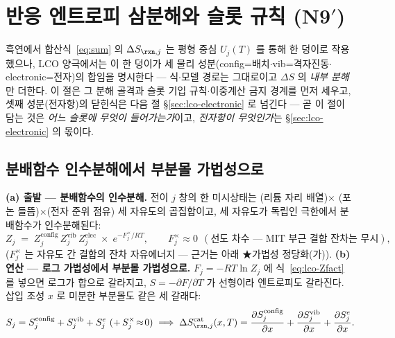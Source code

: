 \section{반응 엔트로피 삼분해와 슬롯 규칙 (N9$'$)}\label{sec:lco-decomp}
흑연에서 합산식~\eqref{eq:sum} 의 $\Delta S_{\rxn,j}$ 는 평형 중심 $U_j(T)$ 를 통해 한 덩이로 작용했으나, LCO 양극에서는 이 한 덩이가 세 물리 성분(config=배치$\cdot$vib=격자진동$\cdot$electronic=전자)의 합임을 명시한다 --- 식$\cdot$모델 경로는 그대로이고 $\Delta S$ 의 \emph{내부 분해}만 더한다. 이 절은 그 분해 골격과 슬롯 기입 규칙$\cdot$이중계산 금지 경계를 먼저 세우고, 셋째 성분(전자항)의 닫힌식은 다음 절 \S\ref{sec:lco-electronic} 로 넘긴다 --- 곧 이 절이 담는 것은 \emph{어느 슬롯에 무엇이 들어가는가}이고, \emph{전자항이 무엇인가}는 \S\ref{sec:lco-electronic} 의 몫이다.

\subsection{분배함수 인수분해에서 부분몰 가법성으로}\label{sec:lco-decomp-add}
\textbf{(a) 출발 --- 분배함수의 인수분해.} 전이 $j$ 창의 한 미시상태는 (리튬 자리 배열)$\times$
(포논 들뜸)$\times$(전자 준위 점유) 세 자유도의 곱집합이고, 세 자유도가 독립인 극한에서 분배함수가
인수분해된다:
\begin{equation}
Z_j\;=\;Z_j^\mathrm{config}\,Z_j^\mathrm{vib}\,Z_j^\mathrm{elec}\;\times\;e^{-F_j^{\times}/RT},
\qquad F_j^{\times}\approx0\ \ (\text{선도 차수 --- MIT 부근 결합 잔차는 무시}),
\label{eq:lco-Zfact}
\end{equation}
($F_j^{\times}$ 는 자유도 간 결합의 잔차 자유에너지 --- 근거는 아래 ★가법성 정당화(가)). \textbf{(b) 연산 --- 로그
가법성에서 부분몰 가법성으로.} $F_j=-RT\ln Z_j$ 에 식~\eqref{eq:lco-Zfact} 를 넣으면 로그가 합으로
갈라지고, $S=-\partial F/\partial T$ 가 선형이라 엔트로피도 갈라진다. 삽입 조성 $x$ 로 미분한 부분몰도
같은 세 갈래다:
\begin{equation}
S_j=S_j^\mathrm{config}+S_j^\mathrm{vib}+S_j^{e}\ (+\,S_j^{\times}\!\approx\!0)
\;\Longrightarrow\;
\Delta S_{\rxn,j}^\mathrm{cat}(x,T)=\frac{\partial S_j^\mathrm{config}}{\partial x}
+\frac{\partial S_j^\mathrm{vib}}{\partial x}
+\frac{\partial S_j^{e}}{\partial x}.
\label{eq:lco-Sadd}
\end{equation}

